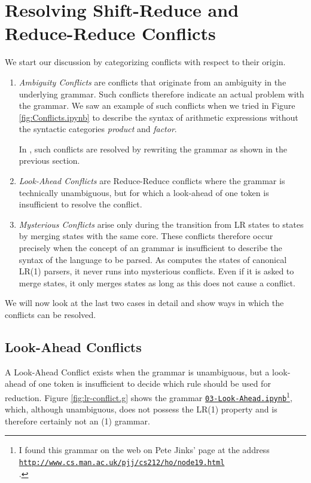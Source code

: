 \section{Resolving Shift-Reduce and Reduce-Reduce Conflicts \label{section:resolving-conflicts}}
We start our discussion by categorizing conflicts with respect to their origin.
\begin{enumerate}
\item \emph{Ambiguity Conflicts} are conflicts that originate from an ambiguity
      in the underlying grammar. Such conflicts therefore indicate an actual
      problem with the grammar. We saw an example of such conflicts when we
      tried in Figure \ref{fig:Conflicts.ipynb}
      to describe the syntax of arithmetic expressions without the syntactic
      categories \textsl{product} and \textsl{factor}.

      In , such conflicts are resolved by rewriting the grammar as shown in the previous
      section.
\item \emph{Look-Ahead Conflicts} are Reduce-Reduce conflicts where the grammar is
      technically unambiguous, but for which a look-ahead of one token is
      insufficient to resolve the conflict.
\item \emph{Mysterious Conflicts} arise only during the transition from LR states to  states
      by merging states with the same core. These conflicts therefore occur
      precisely when the concept of an  grammar is insufficient to describe the syntax of the
      language to be parsed.  As  computes the states of canonical LR(1) parsers, it never
      runs into mysterious conflicts.  Even if it is asked to merge states, it only merges states as long as
      this does not cause a conflict.
\end{enumerate}
We will now look at the last two cases in detail and show ways in which the conflicts can be resolved.

\subsection{Look-Ahead Conflicts}
A Look-Ahead Conflict exists when the grammar is unambiguous, but a look-ahead of one
token is insufficient to decide which rule should be used for reduction. Figure
\ref{fig:lr-conflict.g} shows the grammar
\href{https://github.com/karlstroetmann/Formal-Languages/blob/master/Python/Chapter-11/03-Look-Ahead.ipynb}{\texttt{03-Look-Ahead.ipynb}}\footnote{
I found this grammar on the web on Pete Jinks' page at the address
\\[0.1cm]
\hspace*{1.3cm}
\href{http://www.cs.man.ac.uk/~pjj/cs212/ho/node19.html}{\texttt{http://www.cs.man.ac.uk/pjj/cs212/ho/node19.html}}
\\[0.1cm]
.},
which, although unambiguous, does not possess the LR(1) property and is therefore certainly not an (1) grammar.

